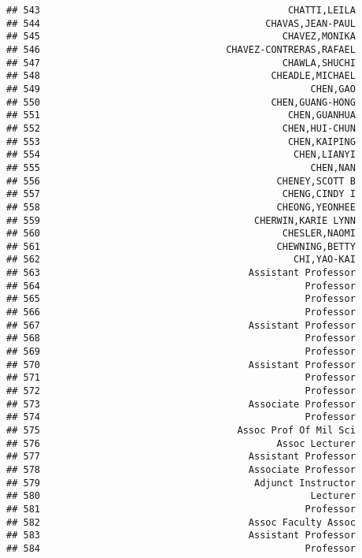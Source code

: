 \documentclass[
]{article}
\begin{document}
\begin{verbatim}
## 543                                            CHATTI,LEILA
## 544                                        CHAVAS,JEAN-PAUL
## 545                                           CHAVEZ,MONIKA
## 546                                 CHAVEZ-CONTRERAS,RAFAEL
## 547                                           CHAWLA,SHUCHI
## 548                                         CHEADLE,MICHAEL
## 549                                                CHEN,GAO
## 550                                         CHEN,GUANG-HONG
## 551                                            CHEN,GUANHUA
## 552                                           CHEN,HUI-CHUN
## 553                                            CHEN,KAIPING
## 554                                             CHEN,LIANYI
## 555                                                CHEN,NAN
## 556                                          CHENEY,SCOTT B
## 557                                           CHENG,CINDY I
## 558                                          CHEONG,YEONHEE
## 559                                      CHERWIN,KARIE LYNN
## 560                                           CHESLER,NAOMI
## 561                                          CHEWNING,BETTY
## 562                                             CHI,YAO-KAI
## 563                                     Assistant Professor
## 564                                               Professor
## 565                                               Professor
## 566                                               Professor
## 567                                     Assistant Professor
## 568                                               Professor
## 569                                               Professor
## 570                                     Assistant Professor
## 571                                               Professor
## 572                                               Professor
## 573                                     Associate Professor
## 574                                               Professor
## 575                                   Assoc Prof Of Mil Sci
## 576                                          Assoc Lecturer
## 577                                     Assistant Professor
## 578                                     Associate Professor
## 579                                      Adjunct Instructor
## 580                                                Lecturer
## 581                                               Professor
## 582                                     Assoc Faculty Assoc
## 583                                     Assistant Professor
## 584                                               Professor

\end{verbatim}
\end{document}
